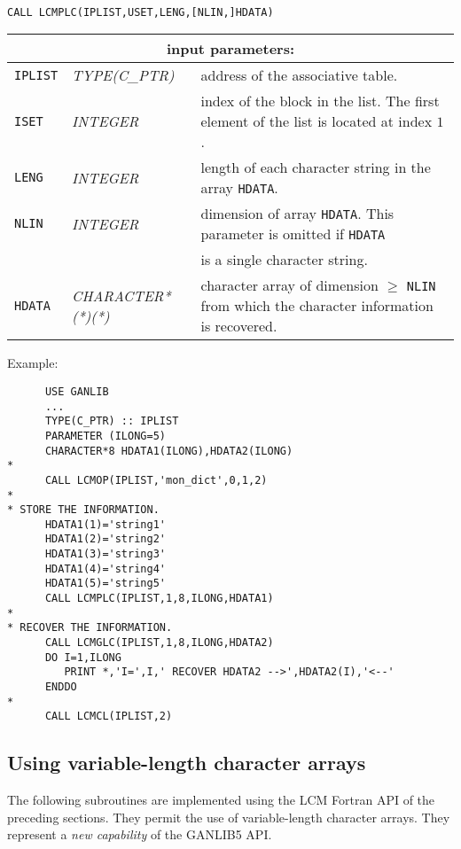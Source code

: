 \begin{verbatim}

CALL LCMPLC(IPLIST,USET,LENG,[NLIN,]HDATA)
\end{verbatim}

\noindent
\begin{tabular}{|p{1.5cm}|p{3.5cm}|p{9.5cm}|}
\hline
\multicolumn{3}{|c|}{\bf input parameters:} \\
\hline
{\tt IPLIST} & {\it TYPE(C\_PTR)} & address of the associative table. \\
\hline
{\tt ISET} & {\it INTEGER} & index of the block in the list.
The first element of the list is located at index $1$. \\
\hline
{\tt LENG} & {\it INTEGER} & length of each character string in the array {\tt HDATA}. \\
\hline
{\tt NLIN} & {\it INTEGER} & dimension of array {\tt HDATA}. This parameter is omitted if {\tt HDATA} \\
& & is a single character string. \\
\hline
{\tt HDATA} & {\it CHARACTER*(*)(*)} & character array of dimension $\ge$ {\tt NLIN} from which the character information is recovered. \\
\hline
\end{tabular}

\vskip 0.4cm
\goodbreak

\noindent Example:
\begin{verbatim}
      USE GANLIB
      ...
      TYPE(C_PTR) :: IPLIST
      PARAMETER (ILONG=5)
      CHARACTER*8 HDATA1(ILONG),HDATA2(ILONG)
*
      CALL LCMOP(IPLIST,'mon_dict',0,1,2)
*
* STORE THE INFORMATION.
      HDATA1(1)='string1'
      HDATA1(2)='string2'
      HDATA1(3)='string3'
      HDATA1(4)='string4'
      HDATA1(5)='string5'
      CALL LCMPLC(IPLIST,1,8,ILONG,HDATA1)
*
* RECOVER THE INFORMATION.
      CALL LCMGLC(IPLIST,1,8,ILONG,HDATA2)
      DO I=1,ILONG
         PRINT *,'I=',I,' RECOVER HDATA2 -->',HDATA2(I),'<--'
      ENDDO
*
      CALL LCMCL(IPLIST,2)
\end{verbatim}

\vskip 0.8cm

\subsection{Using variable-length character arrays}

The following subroutines are implemented using the LCM Fortran API of the preceding sections. They
permit the use of variable-length character arrays. They represent a {\sl new capability} of the GANLIB5 API.

